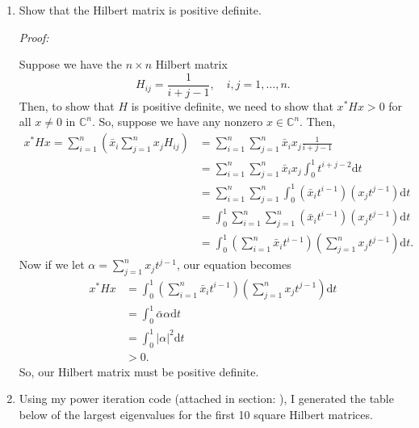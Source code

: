 \documentclass[a4paper,12pt]{article}
\newcommand{\comps}{\mathbb{C}}
\newcommand{\abs}[1]{\left| #1 \right|}
\newcommand{\dd}{\mathrm{d}}
\newenvironment{proof}[2][$\square$]
    {\setlength{\parskip}{0pt}\par\textit{Proof:} #2\setlength{\parskip}{0.25cm}
        \savebox{\qed}{#1}
        \begin{adjustwidth}{\widthof{Proof:}}{}
    }
    {
        \hfill\usebox{\qed}\end{adjustwidth}
    }
\begin{document}
\begin{enumerate}[label = (\arabic*)]
	\item Show that the Hilbert matrix is positive definite.
	
	\begin{proof}{}
		Suppose we have the $ n \times n $ Hilbert matrix
		\[
			H_{ij} = \frac{1}{i + j - 1}, \quad i,j = 1, \ldots, n.
		\]
		Then, to show that $ H $ is positive definite, we need to show that $ x^* H x > 0 $ for all $ x \neq 0 $ in $ \comps^n $. So, suppose we have any nonzero $ x \in \comps^n $.
		Then,
		\begin{align*}
			x^* H x = \sum_{i = 1}^{n} \left(\bar{x}_i \sum_{j = 1}^{n} x_j H_{ij}\right) &= \sum_{i = 1}^{n} \sum_{j = 1}^{n} \bar{x}_i x_j \frac{1}{i + j - 1} \\
			&= \sum_{i = 1}^{n} \sum_{j = 1}^{n} \bar{x}_i x_j \int_{0}^{1} t^{i + j - 2} \dd t \\
			&= \sum_{i = 1}^{n} \sum_{j = 1}^{n} \int_{0}^{1} (\bar{x}_i t^{i - 1}) (x_j t^{j - 1}) \dd t \\
			&= \int_{0}^{1} \sum_{i = 1}^{n} \sum_{j = 1}^{n} (\bar{x}_i t^{i - 1}) (x_j t^{j - 1}) \dd t \\
			&= \int_{0}^{1} \left(\sum_{i = 1}^{n} \bar{x}_i t^{i - 1}\right) \left(\sum_{j = 1}^{n} x_j t^{j - 1}\right) \dd t.
		\end{align*}
		Now if we let $ \alpha = \sum_{j = 1}^{n} x_j t^{j - 1} $, our equation becomes
		\begin{align*}
			x^* H x &= \int_{0}^{1} \left(\sum_{i = 1}^{n} \bar{x}_i t^{i - 1}\right) \left(\sum_{j = 1}^{n} x_j t^{j - 1}\right) \dd t \\
			&= \int_{0}^{1} \bar{\alpha} \alpha \dd t \\
			&= \int_{0}^{1} \abs{\alpha}^2 \dd t \\
			&> 0.
		\end{align*}
		So, our Hilbert matrix must be positive definite.
	\end{proof}

	\newpage
	\item Using my power iteration code (attached in section: ), I generated the table below of the largest eigenvalues for the first 10 square Hilbert matrices.
	

\end{enumerate}
\end{document}
